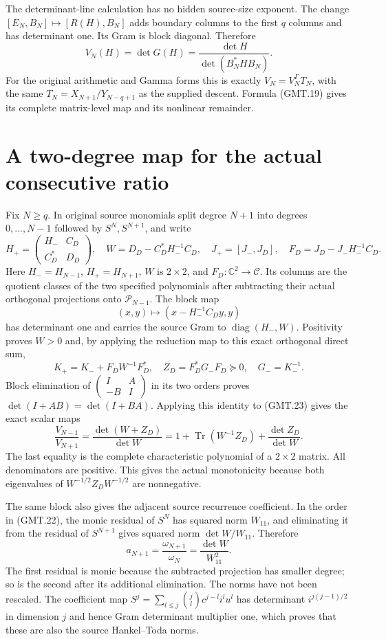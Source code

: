 \documentclass[11pt]{article}
\newcommand{\C}{\mathbb C}
\newcommand{\tr}{\operatorname{Tr}}
\newcommand{\diag}{\operatorname{diag}}
\begin{document}
The determinant-line calculation has no hidden source-size exponent.
The change $[E_N,B_N]\mapsto[R(H),B_N]$ adds boundary columns to
the first $q$ columns and has determinant one. Its Gram is block
diagonal. Therefore
\[
 V_N(H)=\det G(H)=\frac{\det H}{\det(B_N^*HB_N)}.               \tag{GMT.21}
\]
For the original arithmetic and Gamma forms this is exactly
$V_N=V_N^\Gamma T_N$, with the same $T_N=X_{N+1}/Y_{N-q+1}$
as the supplied descent. Formula (GMT.19) gives its complete
matrix-level map and its nonlinear remainder.

\section{A two-degree map for the actual consecutive ratio}

Fix $N\ge q$. In original source monomials split degree $N+1$
into degrees $0,\ldots,N-1$ followed by $S^N,S^{N+1}$, and write
\[
 H_+=\begin{pmatrix}H_-&C_D\\ C_D^*&D_D\end{pmatrix},\quad
 W=D_D-C_D^*H_-^{-1}C_D,\quad
 J_+=[J_-,J_D],\quad F_D=J_D-J_-H_-^{-1}C_D.                   \tag{GMT.22}
\]
Here $H_-=H_{N-1}$, $H_+=H_{N+1}$, $W$ is $2\times2$, and
$F_D:\C^2\to\mathcal C$. Its columns are the quotient classes
of the two specified polynomials after subtracting their actual
orthogonal projections onto $\mathcal P_{N-1}$. The block map
\[
 (x,y)\longmapsto(x-H_-^{-1}C_Dy,y)
\]
has determinant one and carries the source Gram to
$\diag(H_-,W)$. Positivity proves $W>0$ and, by applying the
reduction map to this exact orthogonal direct sum,
\[
 K_+=K_-+F_DW^{-1}F_D^*,\quad
 Z_D=F_D^*G_-F_D\succeq0,\quad G_-=K_-^{-1}.                  \tag{GMT.23}
\]
Block elimination of $\left(\begin{smallmatrix}I&A\\-B&I\end{smallmatrix}\right)$
in its two orders proves $\det(I+AB)=\det(I+BA)$.
Applying this identity to (GMT.23) gives the exact scalar maps
\[
 \boxed{\frac{V_{N-1}}{V_{N+1}}
   =\frac{\det(W+Z_D)}{\det W}
   =1+\tr(W^{-1}Z_D)+\frac{\det Z_D}{\det W}.}                 \tag{GMT.24}
\]
The last equality is the complete characteristic polynomial of a
$2\times2$ matrix. All denominators are positive. This gives the
actual monotonicity because both eigenvalues of
$W^{-1/2}Z_DW^{-1/2}$ are nonnegative.

The same block also gives the adjacent source recurrence coefficient.
In the order in (GMT.22), the monic residual of $S^N$ has squared
norm $W_{11}$, and eliminating it from the residual of $S^{N+1}$
gives squared norm $\det W/W_{11}$. Therefore
\[
 \boxed{a_{N+1}=\frac{\omega_{N+1}}{\omega_N}
                   =\frac{\det W}{W_{11}^2}.}                 \tag{GMT.25}
\]
The first residual is monic because the subtracted projection has
smaller degree; so is the second after its additional elimination.
The norms have not been rescaled. The coefficient map
$S^j=\sum_{l\le j}\binom jl c^{j-l}i^lu^l$ has determinant
$i^{j(j-1)/2}$ in dimension $j$ and hence Gram determinant multiplier
one, which proves that these are also the source Hankel--Toda norms.
\end{document}
